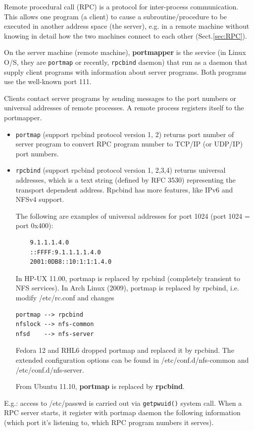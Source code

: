 Remote procedural call (RPC) is a protocol for inter-process communication. This
allows one program (a client) to cause a subroutine/procedure to be executed in
another address space (the server), e.g. in a remote machine without knowing in
detail how the two machines connect to each other (Sect.\ref{sec:RPC}).

On the server machine (remote machine), {\bf portmapper} is the service (in
Linux O/S, they are \verb!portmap! or recently, \verb!rpcbind! daemon) that run
as a daemon that supply client programs with information about server programs.
Both programs use the well-known port 111.

Clients contact server programs by sending messages to the port numbers or
universal addresses of remote processes. A remote process registers itself to
the portmapper.
\begin{itemize}
  \item \verb!portmap! (support rpcbind protocol version 1, 2) returns port
  number of server program to convert RPC program number to TCP/IP (or UDP/IP) port numbers.

  \item \verb!rpcbind! (support rpcbind protocol version 1, 2,3,4) returns
  universal addresses, which is a text string (defined by RFC 3530) representing the
  transport dependent address. Rpcbind has more features, like IPv6 and NFSv4
  support.
  
The following are examples of universal addresses for port 1024 (port 1024 = port 0x400):
\begin{verbatim}
    9.1.1.1.4.0
    ::FFFF:9.1.1.1.1.4.0
    2001:0DB8::10:1:1:1.4.0
\end{verbatim}  

In HP-UX 11.00, portmap is replaced by rpcbind (completely transient to NFS
services). In Arch Linux (2009), portmap is replaced by rpcbind, i.e. modify
/etc/rc.conf and changes
\begin{verbatim}
portmap --> rpcbind
nfslock --> nfs-common
nfsd    --> nfs-server
\end{verbatim}
Fedora 12 and RHL6 dropped portmap and replaced it by rpcbind. 
The extended configuration options can be found in /etc/conf.d/nfs-common
and /etc/conf.d/nfs-server. 

From Ubuntu 11.10, {\bf portmap} is replaced by {\bf rpcbind}. 
  
\end{itemize}

E.g.: access to /etc/passwd is carried out via \verb!getpwuid()! system call.
When a RPC server starts, it register with portmap daemon the following information
(which port it's listening to, which RPC program numbers it serves).

